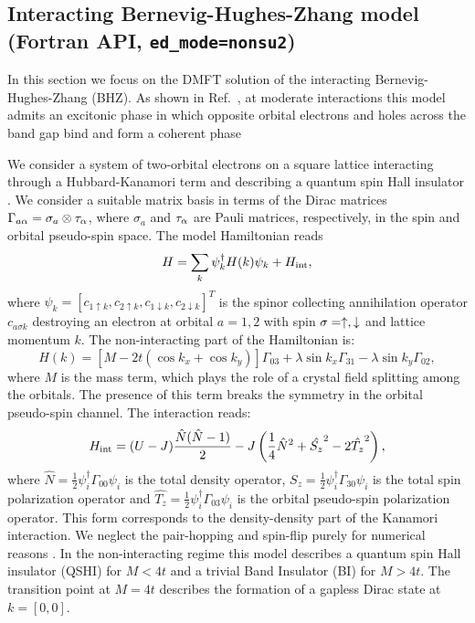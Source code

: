 \documentclass[edipack_sp.tex]{subfiles}
\begin{document}
\subsection{Interacting Bernevig-Hughes-Zhang model (Fortran API, {\tt ed\_mode=nonsu2})}
In this section we focus on the DMFT solution of the interacting
Bernevig-Hughes-Zhang (BHZ).
As shown in Ref.~\cite{Amaricci2023PRB}, at moderate
interactions this model admits an excitonic phase in which opposite
orbital electrons and holes across the band gap bind and form a coherent phase \cite{Knolle2017PRL,Jia2020,Varsano2020NN,Blason2020PRB,Amaricci2023PRB,Giuli2023PRB}

We consider a system of two-orbital electrons on a square
lattice interacting through a Hubbard-Kanamori term and describing
a quantum spin Hall insulator \cite{Kane2005PRL,Bernevig2006S,Konig2007S,Hasan2010RMP,Hohenadler2011PRL,Amaricci2015PRL,Tang2017NP,Amaricci2023PRB,Paoletti2024PRB}.
We consider a suitable matrix basis in terms of the Dirac
matrices $\Gamma_{a\alpha}=\sigma_a\otimes \tau_\alpha$, where $\sigma_a$ and
$\tau_\alpha$ are Pauli matrices, respectively, in the spin and orbital
pseudo-spin space. The  model Hamiltonian reads
$$
H = \sum_{k}\psi_{k}^\dagger H(k)\psi_{k} + H_{\rm int},
$$
where $\psi_{k}=[c_{1\uparrow k}, c_{2\uparrow k},
c_{1\downarrow k}, c_{2\downarrow k} ]^T$ is the spinor collecting
annihilation operator $c_{a\sigma k}$ destroying an electron at
orbital $a=1,2$ with spin  $\sigma=\uparrow,\downarrow$ and lattice momentum
$k$. The non-interacting part of the Hamiltonian is:
$$
H(k) = \left[M-2t(\cos{k_x}+\cos{k_y}) \right]\Gamma_{03} +
   \lambda\sin{k_x}\Gamma_{31} -   \lambda\sin{k_y}\Gamma_{02},
$$
where $M$ is the mass term, which plays the role of a crystal
field splitting among the orbitals. The presence of this term breaks
the symmetry in the orbital pseudo-spin channel.
The  interaction reads: 
$$
   H_{\rm int} = (U-J)\frac{\hat{N}(\hat{N}-1)}{2} - J\left( \frac{1}{4}\hat{N}^2 +
   \hat{S_z}^2 - 2 \hat{T_z}^2\right),
 $$
 where $\hat{N}=\tfrac{1}{2}\psi_i^\dagger \Gamma_{00}\psi_i$ is the
total density operator,
$\hat{S_z}=\tfrac{1}{2}\psi_i^\dagger \Gamma_{30}\psi_i$ is the total
spin polarization operator and $\hat{T_z}=\tfrac{1}{2}\psi_i^\dagger
\Gamma_{03}\psi_i$ is the orbital pseudo-spin polarization operator.
This form corresponds to the density-density part of the
Kanamori interaction. We neglect the pair-hopping and spin-flip purely
for numerical reasons \cite{Amaricci2022CPC}. 
%
In the non-interacting regime this model describes a
quantum spin Hall insulator (QSHI) for $M<4t$ and a trivial Band
Insulator (BI) for $M>4t$.
The transition point at $M=4t$ describes the formation of a gapless Dirac state at  $k=[0,0]$.  
\end{document}
